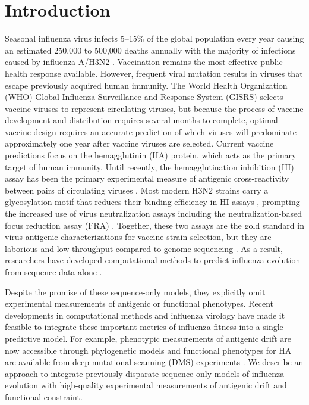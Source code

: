 
\section*{Introduction}

Seasonal influenza virus infects 5--15\% of the global population every year causing an estimated 250,000 to 500,000 deaths annually with the majority of infections caused by influenza A/H3N2 \cite{flufactsheet}.
Vaccination remains the most effective public health response available.
However, frequent viral mutation results in viruses that escape previously acquired human immunity.
The World Health Organization (WHO) Global Influenza Surveillance and Response System (GISRS) selects vaccine viruses to represent circulating viruses, but because the process of vaccine development and distribution requires several months to complete, optimal vaccine design requires an accurate prediction of which viruses will predominate approximately one year after vaccine viruses are selected.
Current vaccine predictions focus on the hemagglutinin (HA) protein, which acts as the primary target of human immunity.
Until recently, the hemagglutination inhibition (HI) assay has been the primary experimental measure of antigenic cross-reactivity between pairs of circulating viruses \cite{hirst1943studies}.
Most modern H3N2 strains carry a glycosylation motif that reduces their binding efficiency in HI assays \cite{Chambers:2015jt,Zost2017}, prompting the increased use of virus neutralization assays including the neutralization-based focus reduction assay (FRA) \cite{Okuno:1990uu}.
Together, these two assays are the gold standard in virus antigenic characterizations for vaccine strain selection, but they are laborious and low-throughput compared to genome sequencing \cite{Wood:2012ii}.
As a result, researchers have developed computational methods to predict influenza evolution from sequence data alone \cite{Luksza:2014hj,Steinbruck:2014kq,Neher:2014eu}.

Despite the promise of these sequence-only models, they explicitly omit experimental measurements of antigenic or functional phenotypes.
Recent developments in computational methods and influenza virology have made it feasible to integrate these important metrics of influenza fitness into a single predictive model.
For example, phenotypic measurements of antigenic drift are now accessible through phylogenetic models \cite{Neher:2016hy} and functional phenotypes for HA are available from deep mutational scanning (DMS) experiments \cite{Lee2018}.
We describe an approach to integrate previously disparate sequence-only models of influenza evolution with high-quality experimental measurements of antigenic drift and functional constraint.

